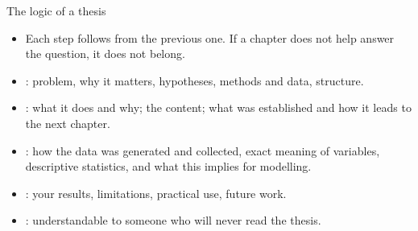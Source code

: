 \documentclass[aspectratio=169,11pt,t]{beamer}
\begin{document}
\begin{frame}{The logic of a thesis}
  \begin{center}
  \end{center}

  \begin{itemize}
    \item Each step follows from the previous one. If a chapter does not help answer the
          question, it does not belong.
    \item {}: problem, why it matters, hypotheses, methods and data, structure.
    \item {}: what it does and why; the content; what was established and how it
          leads to the next chapter.
    \item {}: how the data was generated and collected, exact meaning of variables,
          descriptive statistics, and what this implies for modelling.
    \item {}: your results, limitations, practical use, future work.
    \item {}: understandable to someone who will never read the thesis.
  \end{itemize}
\end{frame}
\end{document}
